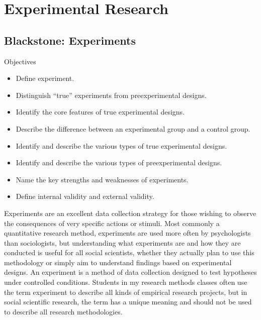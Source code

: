 \chapter{Experimental Research}\label{ch09:experimental_research}

\section{Blackstone: Experiments}

\begin{center}
	\begin{objbox}{Objectives}
		\begin{itemize}
			\setlength{\itemsep}{0pt}
			\setlength{\parskip}{0pt}
			\setlength{\parsep}{0pt}
			
			\item Define experiment.
			\item Distinguish “true” experiments from preexperimental designs.
			\item Identify the core features of true experimental designs.
			\item Describe the difference between an experimental group and a control group.
			\item Identify and describe the various types of true experimental designs.
			\item Identify and describe the various types of preexperimental designs.
			\item Name the key strengths and weaknesses of experiments.
			\item Define internal validity and external validity.
			
		\end{itemize}
	\end{objbox}
\end{center}

Experiments are an excellent data collection strategy for those wishing to observe the consequences of very specific actions or stimuli. Most commonly a quantitative research method, experiments are used more often by psychologists than sociologists, but understanding what experiments are and how they are conducted is useful for all social scientists, whether they actually plan to use this methodology or simply aim to understand findings based on experimental designs. An experiment is a method of data collection designed to test hypotheses under controlled conditions. Students in my research methods classes often use the term experiment to describe all kinds of empirical research projects, but in social scientific research, the term has a unique meaning and should not be used to describe all research methodologies.

